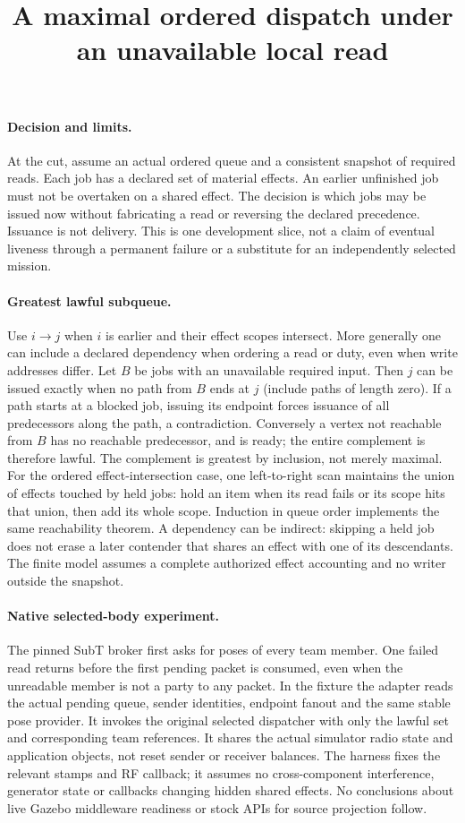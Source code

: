 \documentclass{article}
\title{A maximal ordered dispatch under an unavailable local read}
\author{}\date{}
\begin{document}
\maketitle
\paragraph{Decision and limits.}
At the cut, assume an actual ordered queue and a consistent snapshot of
required reads. Each job has a declared set of material effects.
An earlier unfinished job must not be overtaken on a shared effect.
The decision is which jobs may be issued now without fabricating a read or
reversing the declared precedence. Issuance is not delivery. This is one
development slice, not a claim of eventual liveness through a permanent
failure or a substitute for an independently selected mission.

\paragraph{Greatest lawful subqueue.}
Use $i\to j$ when $i$ is earlier and their effect scopes intersect.
More generally one can include a declared dependency when ordering a read
or duty, even when write addresses differ. Let $B$ be jobs with an unavailable
required input. Then $j$ can be issued exactly when no path from $B$ ends
at $j$ (include paths of length zero). If a path starts at a blocked
job, issuing its endpoint forces issuance of all predecessors along the
path, a contradiction. Conversely a vertex not reachable from $B$ has no
reachable predecessor, and is ready; the entire complement is therefore
lawful. The complement is greatest by inclusion, not merely maximal.
For the ordered effect-intersection case, one left-to-right scan maintains
the union of effects touched by held jobs: hold an item when its read fails
or its scope hits that union, then add its whole scope. Induction in queue
order implements the same reachability theorem. A dependency can be
indirect: skipping a held job does not erase a later contender that shares
an effect with one of its descendants. The finite model assumes a complete
authorized effect accounting and no writer outside the snapshot.

\paragraph{Native selected-body experiment.}
The pinned SubT broker first asks for poses of every team member. One
failed read returns before the first pending packet is consumed, even when
the unreadable member is not a party to any packet. In the fixture the
adapter reads the actual pending queue, sender identities, endpoint fanout
and the same stable pose provider. It invokes the original selected
dispatcher with only the lawful set and corresponding team references.
It shares the actual simulator radio state and application objects, not
reset sender or receiver balances. The harness fixes the relevant stamps
and RF callback; it assumes no cross-component interference, generator
state or callbacks changing hidden shared effects. No conclusions about live
Gazebo middleware readiness or stock APIs for source projection follow.
\end{document}
